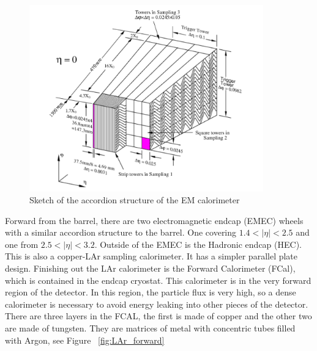 \begin{figure}[h]
\begin{center}
\includegraphics*[width=0.90\textwidth] {figures/figure1-2_b}%
\caption[Sketch of the accordion structure of the EM calorimeter]{Sketch of the accordion structure of the EM calorimeter}
\label{fig:LAr_gran}
\end{center}
\end{figure}

\indent Forward from the barrel, there are two electromagnetic endcap (EMEC) wheels with a similar accordion structure to the barrel. One covering ${1.4 < |\eta{}| < 2.5}$ and one from ${2.5 < |\eta{}| < 3.2}$. Outside of the EMEC is the Hadronic endcap (HEC). This is also a copper-LAr sampling calorimeter. It has a simpler parallel plate design. Finishing out the LAr calorimeter is the Forward Calorimeter (FCal), which is contained in the endcap cryostat. This calorimeter is in the very forward region of the detector. In this region, the particle flux is very high, so a dense calorimeter is necessary to avoid energy leaking into other pieces of the detector. There are three layers in the FCAL, the first is made of copper and the other two are made of tungsten. They are matrices of metal with concentric tubes filled with Argon, see Figure ~\ref{fig:LAr_forward} \newline

